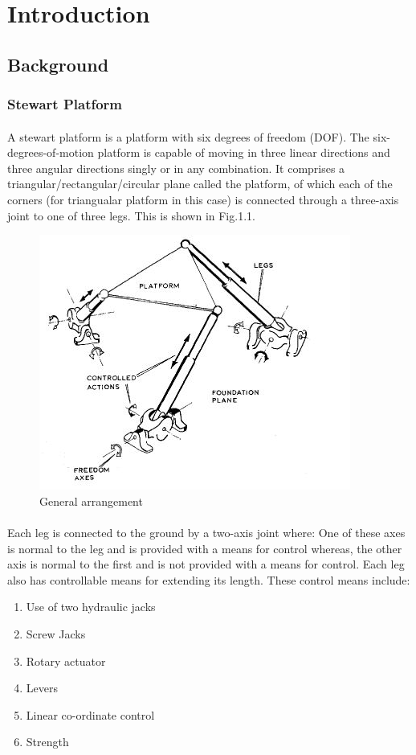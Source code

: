 \section{Introduction}
\label{sec:introduction}
\subsection{Background}
\subsubsection{Stewart Platform}
\paragraph{}A stewart platform is a platform with six degrees of freedom (DOF). The six-degrees-of-motion platform is capable of moving in three linear directions and
three angular directions singly or in any combination.
It comprises a triangular/rectangular/circular plane called the platform, of which each of the corners (for triangualar platform in this case) is connected through a three-axis joint to one of three legs.
This is shown in Fig.1.1.
\begin{center}
	\begin{figure}[!h]
	\centering
	\includegraphics{Figures/Fig1}
	\caption{General arrangement}
	\end{figure}
\end{center}
\paragraph{}Each leg is connected to the ground by a two-axis joint where: One of these axes is
normal to the leg and is provided with a means for control whereas, the other axis is normal to the first and is not provided with a means for control.
Each leg also has controllable means for extending its length. These control means include:
\begin{enumerate}
\item Use of two hydraulic jacks
\item Screw Jacks
\item Rotary actuator
\item Levers
\item Linear co-ordinate control
\item Strength
\end{enumerate}
